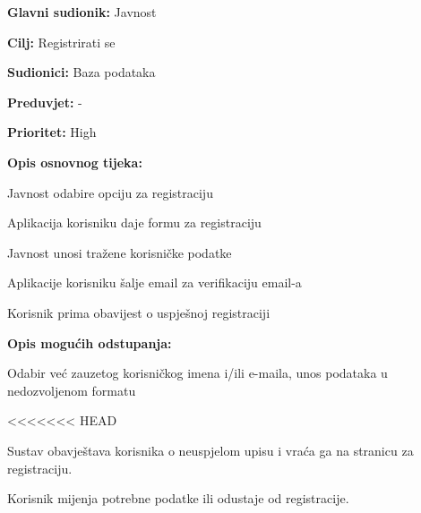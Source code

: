 \noindent {}
	\begin{packed_item}
	
		\item \textbf{Glavni sudionik: }Javnost
		\item  \textbf{Cilj:} Registrirati se
		\item  \textbf{Sudionici:} Baza podataka
		\item  \textbf{Preduvjet:} -
		\item  \textbf{Prioritet:} High
		\item  \textbf{Opis osnovnog tijeka:}
		
		\item[] \begin{packed_enum}

			\item Javnost odabire opciju za registraciju
			\item Aplikacija korisniku daje formu za registraciju
			\item Javnost unosi tražene korisničke podatke
			\item Aplikacije korisniku šalje email za verifikaciju email-a
			\item Korisnik prima obavijest o uspješnoj registraciji
		\end{packed_enum}
		
		\item  \textbf{Opis mogućih odstupanja:}
		
		\item[] \begin{packed_item}

			\item[2.a] Odabir već zauzetog korisničkog imena i/ili e-maila, unos podataka u nedozvoljenom formatu
			\item[] \begin{packed_enum}
				
<<<<<<< HEAD
				\item Sustav obavještava korisnika o neuspjelom upisu i vraća ga na stranicu za registraciju.
				\item Korisnik mijenja potrebne podatke ili odustaje od registracije.

			\end{packed_enum}
		\end{packed_item}						
	\end{packed_item}


